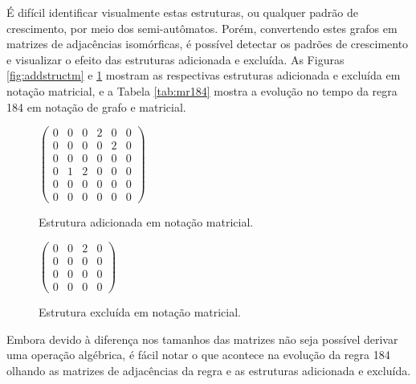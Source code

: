 \documentclass[12pt,a4paper]{article}
\begin{document}
É difícil identificar visualmente estas estruturas, ou qualquer padrão de
crescimento, por meio dos semi-autômatos. Porém, convertendo estes grafos
em matrizes de adjacências isomórficas, é possível detectar os padrões
de crescimento e visualizar o efeito das estruturas adicionada e
excluída. As Figuras \ref{fig:addstructm} e \ref{fig:excstructm} mostram
as respectivas estruturas adicionada e excluída em notação matricial, e
a Tabela \ref{tab:mr184} mostra a evolução no tempo da regra 184 em notação
de grafo e matricial.

\begin{figure}[htp]
\begin{minipage}[b]{0.5\linewidth}
\begin{center}
\begin{math}
\begin{pmatrix}
0 & 0 & 0 & 2 & 0 & 0 \\
0 & 0 & 0 & 0 & 2 & 0 \\
0 & 0 & 0 & 0 & 0 & 0 \\
0 & 1 & 2 & 0 & 0 & 0 \\
0 & 0 & 0 & 0 & 0 & 0 \\
0 & 0 & 0 & 0 & 0 & 0
\end{pmatrix}
\end{math}
\caption{Estrutura adicionada em notação matricial.}
\label{fig:addstructm}
\end{center}
\end{minipage}
\hspace{0.5cm}
\begin{minipage}[b]{0.5\linewidth}
\begin{center}
\begin{math}
\begin{pmatrix}
0 & 0 & 2 & 0 \\
0 & 0 & 0 & 0 \\
0 & 0 & 0 & 0 \\
0 & 0 & 0 & 0
\end{pmatrix}
\end{math}
\caption{Estrutura excluída em notação matricial.}
\label{fig:excstructm}
\end{center}
\end{minipage}
\end{figure}

Embora devido à diferença nos tamanhos das matrizes não seja possível
derivar uma operação algébrica, é fácil notar o que acontece na evolução
da regra 184 olhando as matrizes de adjacências da regra e as estruturas
adicionada e excluída.
\end{document}
